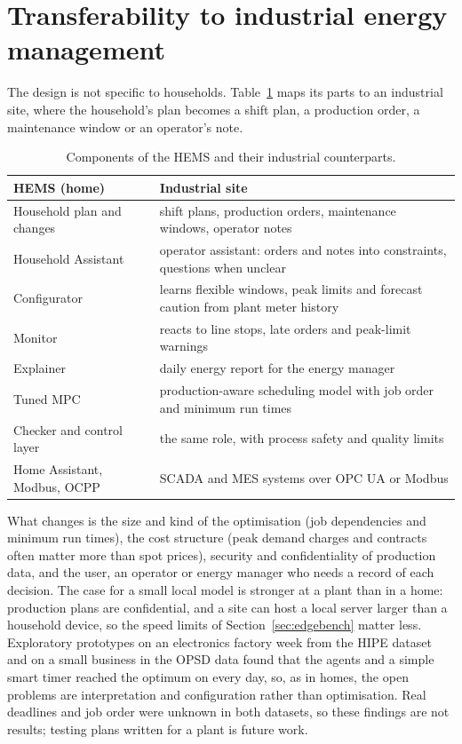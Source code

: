 \section{Transferability to industrial energy management}
\label{sec:industry}

The design is not specific to households. Table~\ref{tab:industry} maps
its parts to an industrial site, where the household's plan becomes a
shift plan, a production order, a maintenance window or an operator's
note.

\begin{table}[htbp]
\caption{Components of the HEMS and their industrial counterparts.}
\label{tab:industry}
\small
\begin{tabularx}{\textwidth}{@{}p{4.2cm}X@{}}
\toprule
HEMS (home) & Industrial site \\
\midrule
Household plan and changes & shift plans, production orders, maintenance windows, operator notes \\
Household Assistant & operator assistant: orders and notes into constraints, questions when unclear \\
Configurator & learns flexible windows, peak limits and forecast caution from plant meter history \\
Monitor & reacts to line stops, late orders and peak-limit warnings \\
Explainer & daily energy report for the energy manager \\
Tuned MPC & production-aware scheduling model with job order and minimum run times \\
Checker and control layer & the same role, with process safety and quality limits \\
Home Assistant, Modbus, OCPP & SCADA and MES systems over OPC UA or Modbus \\
\bottomrule
\end{tabularx}
\end{table}

What changes is the size and kind of the optimisation (job dependencies
and minimum run times), the cost structure (peak demand charges and
contracts often matter more than spot prices), security and
confidentiality of production data, and the user, an operator or energy
manager who needs a record of each decision. The case for a small
local model is stronger at a plant than in a home: production plans are
confidential, and a site can host a local server larger than a
household device, so the speed limits of Section~\ref{sec:edgebench}
matter less. Exploratory prototypes on an electronics factory week from
the HIPE dataset \parencite{bischof2018} and on a small business in the
OPSD data \parencite{opsd2020} found that the agents and a simple smart
timer reached the optimum on every day, so, as in homes, the open
problems are interpretation and configuration rather than optimisation.
Real deadlines and job order were unknown in both datasets, so these
findings are not results; testing plans written for a plant is future
work.

